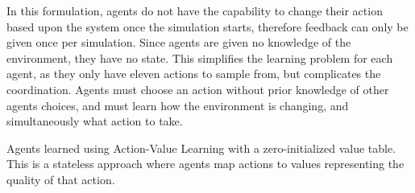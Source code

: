 \documentclass[letterpaper]{article}
\begin{document}
In this formulation, agents do not have the capability to change their action based upon the system once the simulation starts, therefore feedback can only be given once per simulation. Since agents are given no knowledge of the environment, they have no state. This simplifies the learning problem for each agent, as they only have eleven actions to sample from, but complicates the coordination. Agents must choose an action without prior knowledge of other agents choices, and must learn how the environment is changing, and simultaneously what action to take.

Agents learned using Action-Value Learning with a zero-initialized value table. This is a stateless approach where agents map actions to values representing the quality of that action. 




\end{document}
